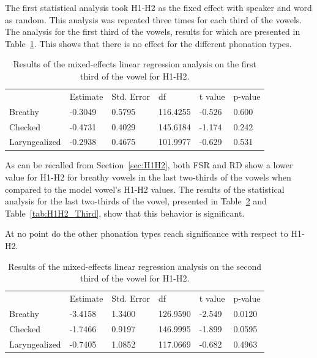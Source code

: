 \documentclass[12pt, letterpaper]{article}
\providecommand{\lsptoprule}{\midrule\toprule}
\providecommand{\lspbottomrule}{\bottomrule\midrule}
\begin{document}
The first statistical analysis took H1-H2 as the fixed effect with speaker and word as random. This analysis was repeated three times for each third of the vowels. The analysis for the first third of the vowels, results for which are presented in Table~\ref{tab:H1H2_First}. This shows that there is no effect for the different phonation types.

\begin{table}[!h]
	\centering
	\caption{Results of the mixed-effects linear regression analysis on the first third of the vowel for H1-H2. }
	\label{tab:H1H2_First}
	 \begin{tabular}{llllll}
	  \lsptoprule
						&  Estimate  & Std. Error & df & t value & p-value \\
	  	Breathy   		&  -0.3049  &   0.5795 & 116.4255 &  -0.526  &  0.600 \\
		Checked    		&  -0.4731  &   0.4029 & 145.6184 &  -1.174  &  0.242 \\
		Laryngealized	&  -0.2938  &   0.4675 & 101.9977 &  -0.629  &  0.531 \\
	  \lspbottomrule
	 \end{tabular}
\end{table}

As can be recalled from Section~\ref{sec:H1H2}, both FSR and RD show a lower value for H1-H2 for breathy vowels in the last two-thirds of the vowels when compared to the model vowel's H1-H2 values. The results of the statistical analysis for the last two-thirds of the vowel, presented in Table~\ref{tab:H1H2_Second} and Table~\ref{tab:H1H2_Third}, show that this behavior is significant.

At no point do the other phonation types reach significance with respect to H1-H2. 

\begin{table}[!h]
	\centering
	\caption{Results of the mixed-effects linear regression analysis on the second third of the vowel for H1-H2. }
	\label{tab:H1H2_Second}
	 \begin{tabular}{llllll}
	  \lsptoprule
						&  Estimate  & Std. Error & df & t value & p-value \\
	  	Breathy   		&  -3.4158  &   1.3400 & 126.9590 &  -2.549  &  0.0120 \\
		Checked    		&  -1.7466  &   0.9197 & 146.9995 &  -1.899  &  0.0595 \\
		Laryngealized	&  -0.7405  &   1.0852 & 117.0669 &  -0.682  &  0.4963 \\
	  \lspbottomrule
	 \end{tabular}
\end{table}
\end{document}

